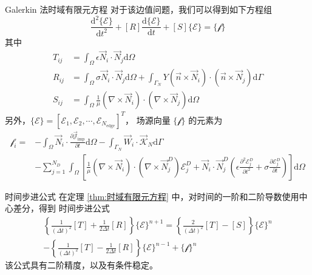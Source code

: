 \begin{theorem}{Galerkin 法}{时域有限元方程}
    对于该边值问题，我们可以得到如下方程组
    \begin{equation}
        [T]\frac{\text{d}^2 \{\mathscr{E}\}}{\text{d}t^2}
        +[R]\frac{\text{d} \{\mathscr{E}\}}{\text{d}t}
        +[S]\{\mathscr{E}\}
        =\{\mathscr{f}\}
    \end{equation}
    其中
    \begin{align}
        T_{ij}&=
        \int_{\Omega}\epsilon\vec{N}_i\cdot\vec{N}_j\text{d}\Omega\\
        R_{ij}&=
        \int_{\Omega}\sigma\vec{N}_i\cdot\vec{N}_j\text{d}\Omega
        +\int_{\Gamma_N}Y(\vec{n}\times\vec{N}_i)\cdot
        (\vec{n}\times\vec{N}_j)\text{d}\Gamma\\
        S_{ij}&=
        \int_{\Omega}\frac{1}{\mu}
        (\nabla\times\vec{N}_i)\cdot(\nabla\times\vec{N}_j)\text{d}\Omega
    \end{align}
    另外，$\{\mathscr{E}\}=\left[\mathscr{E}_1,\mathscr{E}_2,
    \cdots,\mathscr{E}_{N_{\text{edge}}}\right]^T$，
    场源向量 $\{\mathscr{f}\}$ 的元素为
    \begin{equation}
        \begin{aligned}
            \mathscr{f}_i=
            &-\int_{\Omega}\vec{N}_i\cdot
            \frac{\partial\vec{\mathscr{J}}_{\text{imp}}}{\partial t}\text{d}\Omega
            -\int_{\Gamma_N}\vec{W}_i\cdot\vec{\mathscr{K}}_N\text{d}\Gamma\\
            &-\sum_{j=1}^{N_D}
            \int_{\Omega}\left[
                \frac{1}{\mu}
                (\nabla\times\vec{N}_i)\cdot(\nabla\times\vec{N}_j^D)\mathscr{E}_j^D
                +\vec{N}_i\cdot\vec{N}_j^D
                \left(
                    \epsilon\frac{\partial^2\mathscr{E}_j^D}{\partial t^2}
                    +\sigma\frac{\partial\mathscr{E}_j^D}{\partial t}
                \right)
            \right]\text{d}\Omega
        \end{aligned}
    \end{equation}    
\end{theorem}

\begin{theorem}{时间步进公式}
    在定理 \ref{thm:时域有限元方程} 中，对时间的一阶和二阶导数使用中心差分，得到
    时间步进公式
    \begin{equation}
        \begin{gathered}
            \left\{
                \frac{1}{(\Delta t)^2}[T]
                +\frac{1}{2\Delta t}[R]
            \right\}\{\mathscr{E}\}^{n+1}
            =\left\{
                \frac{2}{(\Delta t)^2}[T]
                -[S]
            \right\}\{\mathscr{E}\}^n\\
            -\left\{
                \frac{1}{(\Delta t)^2}[T]
                -\frac{1}{2\Delta t}[R]
            \right\}\{\mathscr{E}\}^{n-1}
            +\{\mathscr{f}\}^n
        \end{gathered}
    \end{equation}
    该公式具有二阶精度，以及有条件稳定。
\end{theorem}

